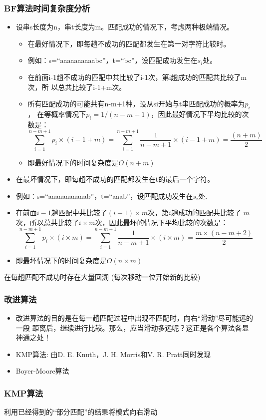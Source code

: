 \begin{frame}[fragile]
  \frametitle{BF算法时间复杂度分析}
  \begin{itemize}
  \item 设串s长度为n，串t长度为m。匹配成功的情况下，考虑两种极端情况。
    \begin{itemize}
    \item 在最好情况下，即每趟不成功的匹配都发生在第一对字符比较时。
    \item 例如：s=“aaaaaaaaaabc”，t=“bc”，设匹配成功发生在$s_i$处。
    \item 在前面i-1趟不成功的匹配中共比较了i-1次，第i趟成功的匹配共比较了m次，所
      以总共比较了i-1+m次。
    \item 所有匹配成功的可能共有n-m+1种，设从si开始与t串匹配成功的概率为$p_i$，
      在等概率情况下$p_i=1/(n-m+1)$，因此最好情况下平均比较的次数是：
      \[\sum_{i=1}^{n-m+1} p_i \times (i-1+m) = \sum_{i=1}^{n-m+1} \dfrac{1}{n-m+1} \times (i-1+m) = \dfrac{(n+m)}{2}\]

    \item 即最好情况下的时间复杂度是$O(n+m)$
    \end{itemize}
  \end{itemize}
\end{frame}

\begin{frame}[fragile]
  \begin{itemize}
  \item 在最坏情况下，即每趟不成功的匹配都发生在t的最后一个字符。
  \item 例如：s=“aaaaaaaaaaab”，t=“aaab”，设匹配成功发生在$s_i$处.
  \item 在前面$i-1$趟匹配中共比较了$(i-1) \times m$次，第$i$趟成功的匹配共比较了
    $m$次，所以总共比较了$i \times m$次，因此最坏的情况下平均比较的次数是：
    \[\sum_{i=1}^{n-m+1} p_i \times (i \times m) = \sum_{i=1}^{n-m+1} \dfrac{1}{n-m+1} \times (i \times m) = \dfrac{m \times (n-m+2)}{2}\]
  \item 即最坏情况下的时间复杂度是$O(n×m)$
  \end{itemize}

  \begin{tcolorbox}[title=为什么BF算法时间性能低？]
    在每趟匹配不成功时存在大量回溯 (每次移动一位开始新的比较)
  \end{tcolorbox}
\end{frame}

\begin{frame}[fragile]
  \frametitle{改进算法}
  \begin{itemize}
  \item 改进算法的目的是在每一趟匹配过程中出现不匹配时，向右“滑动”尽可能远的一段
    距离后，继续进行比较。那么，应当滑动多远呢？这正是各个算法各显神通之处！

  \item KMP算法: 由D. E. Knuth，J. H. Morris和V. R. Pratt同时发现

  \item Boyer-Moore算法
  \end{itemize}
\end{frame}

\begin{frame}[fragile]
  \frametitle{KMP算法}
  利用已经得到的“部分匹配”的结果将模式向右滑动

\end{frame}
